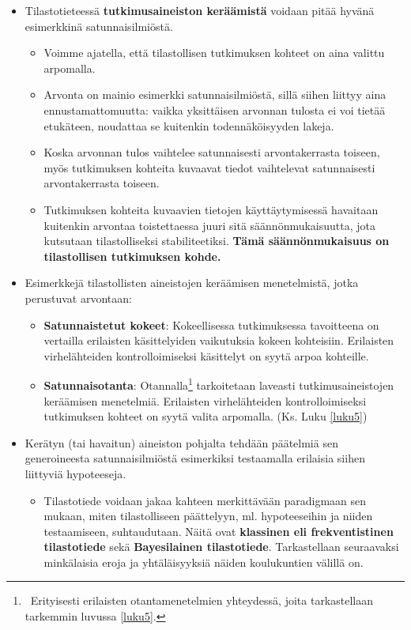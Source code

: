 \documentclass[
]{book}
\providecommand{\tightlist}{%
  \setlength{\itemsep}{0pt}\setlength{\parskip}{0pt}}
\begin{document}
\begin{itemize}
\tightlist
\item
  Tilastotieteessä \textbf{tutkimusaineiston keräämistä} voidaan pitää hyvänä esimerkkinä satunnaisilmiöstä.

  \begin{itemize}
  \tightlist
  \item
    Voimme ajatella, että tilastollisen tutkimuksen kohteet on aina valittu arpomalla.
  \item
    Arvonta on mainio esimerkki satunnaisilmiöstä, sillä siihen liittyy aina ennustamattomuutta: vaikka yksittäisen arvonnan tulosta ei voi tietää etukäteen, noudattaa se kuitenkin todennäköisyyden lakeja.
  \item
    Koska arvonnan tulos vaihtelee satunnaisesti arvontakerrasta toiseen, myös tutkimuksen kohteita kuvaavat tiedot vaihtelevat satunnaisesti arvontakerrasta toiseen.
  \item
    Tutkimuksen kohteita kuvaavien tietojen käyttäytymisessä havaitaan kuitenkin arvontaa toistettaessa juuri sitä säännönmukaisuutta, jota kutsutaan tilastolliseksi stabiliteetiksi. \textbf{Tämä säännönmukaisuus on tilastollisen tutkimuksen kohde.}
  \end{itemize}
\item
  Esimerkkejä tilastollisten aineistojen keräämisen menetelmistä, jotka perustuvat arvontaan:

  \begin{itemize}
  \tightlist
  \item
    \textbf{Satunnaistetut kokeet}: Kokeellisessa tutkimuksessa tavoitteena on vertailla erilaisten käsittelyiden vaikutuksia kokeen kohteisiin. Erilaisten virhelähteiden kontrolloimiseksi käsittelyt on syytä arpoa kohteille.
  \item
    \textbf{Satunnaisotanta}: Otannalla\footnote{~Erityisesti erilaisten otantamenetelmien yhteydessä, joita tarkastellaan tarkemmin luvussa \ref{luku5}.} tarkoitetaan laveasti tutkimusaineistojen keräämisen menetelmiä. Erilaisten virhelähteiden kontrolloimiseksi tutkimuksen kohteet on syytä valita arpomalla. (Ks. Luku \ref{luku5})
  \end{itemize}
\item
  Kerätyn (tai havaitun) aineiston pohjalta tehdään päätelmiä sen generoineesta satunnaisilmiöstä esimerkiksi testaamalla erilaisia siihen liittyviä hypoteeseja.

  \begin{itemize}
  \tightlist
  \item
    Tilastotiede voidaan jakaa kahteen merkittävään paradigmaan sen mukaan, miten tilastolliseen päättelyyn, ml. hypoteeseihin ja niiden testaamiseen, suhtaudutaan. Näitä ovat \textbf{klassinen eli frekventistinen tilastotiede} sekä \textbf{Bayesilainen tilastotiede}. Tarkastellaan seuraavaksi minkälaisia eroja ja yhtäläisyyksiä näiden koulukuntien välillä on.
  \end{itemize}
\end{itemize}
\end{document}
